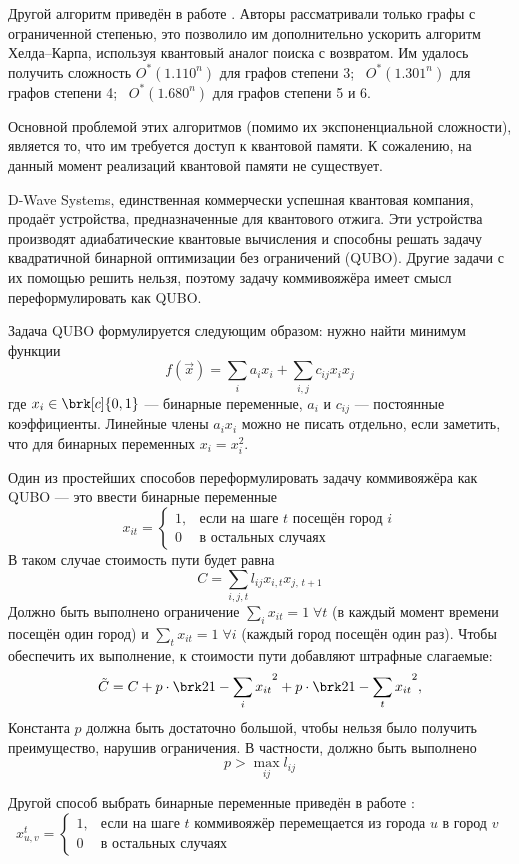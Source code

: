 Другой алгоритм приведён в работе \cite{boundedDegreeGraphs}. Авторы рассматривали только графы с ограниченной степенью, это позволило им дополнительно ускорить алгоритм Хелда--Карпа, используя квантовый аналог поиска с возвратом. Им удалось получить сложность $O^*(1.110^n)$ для графов степени 3; \ $O^*(1.301^n)$ для графов степени 4; \ $O^*(1.680^n)$ для графов степени 5 и 6.

Основной проблемой этих алгоритмов (помимо их экспоненциальной сложности), является то, что им требуется доступ к квантовой памяти. К сожалению, на данный момент реализаций квантовой памяти не существует.



D-Wave Systems, единственная коммерчески успешная квантовая компания, продаёт устройства, предназначенные для квантового отжига. Эти устройства производят адиабатические квантовые вычисления и способны решать задачу квадратичной бинарной оптимизации без ограничений (QUBO). Другие задачи с их помощью решить нельзя, поэтому задачу коммивояжёра имеет смысл переформулировать как QUBO.

Задача QUBO формулируется следующим образом: нужно найти минимум функции
$$
f(\vec x) = \sum_i a_i x_i + \sum_{i,j} c_{ij} x_i x_j
$$
где $x_i \in \brk[c]{0, 1}$ --- бинарные переменные, $a_i$ и $c_{ij}$ --- постоянные коэффициенты.
Линейные члены $a_i x_i$ можно не писать отдельно, если заметить, что для бинарных переменных $x_i = x_i^2$.

Один из простейших способов \cite{allQUBOs} переформулировать задачу коммивояжёра как QUBO --- это ввести бинарные переменные
$$
x_{i t} = 
\begin{cases}
    1, &\text{если на шаге $t$ посещён город $i$} \\
    0 &\text{в остальных случаях}
\end{cases}
$$
В таком случае стоимость пути будет равна
$$
C = \sum_{i,j,t} l_{ij} x_{i, t} x_{j,\, t+1}
$$
Должно быть выполнено ограничение $\sum\limits_i x_{it} = 1 \;\forall t$ (в каждый момент времени посещён один город) и $\sum\limits_t x_{it} = 1 \;\forall i$ (каждый город посещён один раз). Чтобы обеспечить их выполнение, к стоимости пути добавляют штрафные слагаемые:
$$
\tilde C = C + p \cdot \brk2{1 - \sum_i x_{it}}^2 + p \cdot \brk2{1 - \sum_t x_{it}}^2,
$$
Константа $p$ должна быть достаточно большой, чтобы нельзя было получить преимущество, нарушив ограничения. В частности, должно быть выполнено 
$$p > \max_{ij} l_{ij}$$

Другой способ выбрать бинарные переменные приведён в работе \cite{QUBO-TSP}: %
$$
x^t_{u, v} =
\begin{cases}
    1, & \text{если на шаге $t$ коммивояжёр перемещается из города $u$ в город $v$} \\
    0 &\text{в остальных случаях}
\end{cases}
$$

